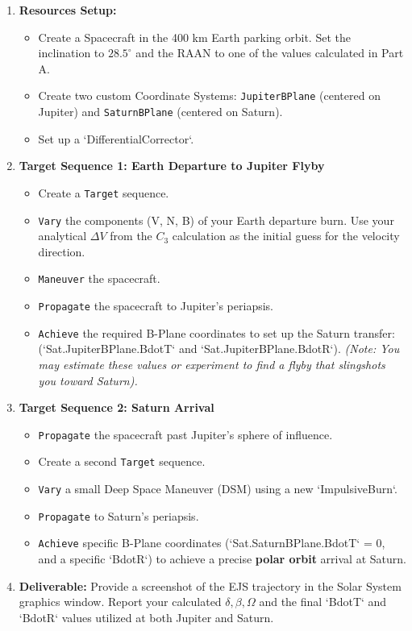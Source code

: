 \documentclass[11pt, letterpaper]{article}
\begin{document}
\begin{enumerate}
    \item \textbf{Resources Setup:} 
    \begin{itemize}
        \item Create a Spacecraft in the 400 km Earth parking orbit. Set the inclination to $28.5^\circ$ and the RAAN to one of the values calculated in Part A.
        \item Create two custom Coordinate Systems: \texttt{JupiterBPlane} (centered on Jupiter) and \texttt{SaturnBPlane} (centered on Saturn).
        \item Set up a `DifferentialCorrector`.
    \end{itemize}
    \item \textbf{Target Sequence 1: Earth Departure to Jupiter Flyby}
        \begin{itemize}
            \item Create a \texttt{Target} sequence.
            \item \texttt{Vary} the components (V, N, B) of your Earth departure burn. Use your analytical $\Delta V$ from the $C_3$ calculation as the initial guess for the velocity direction.
            \item \texttt{Maneuver} the spacecraft.
            \item \texttt{Propagate} the spacecraft to Jupiter's periapsis.
            \item \texttt{Achieve} the required B-Plane coordinates to set up the Saturn transfer: (`Sat.JupiterBPlane.BdotT` and `Sat.JupiterBPlane.BdotR`). \textit{(Note: You may estimate these values or experiment to find a flyby that slingshots you toward Saturn).}
        \end{itemize}
    \item \textbf{Target Sequence 2: Saturn Arrival}
        \begin{itemize}
            \item \texttt{Propagate} the spacecraft past Jupiter's sphere of influence.
            \item Create a second \texttt{Target} sequence.
            \item \texttt{Vary} a small Deep Space Maneuver (DSM) using a new `ImpulsiveBurn`.
            \item \texttt{Propagate} to Saturn's periapsis.
            \item \texttt{Achieve} specific B-Plane coordinates (`Sat.SaturnBPlane.BdotT` = 0, and a specific `BdotR`) to achieve a precise \textbf{polar orbit} arrival at Saturn.
        \end{itemize}
    \item \textbf{Deliverable:} Provide a screenshot of the EJS trajectory in the Solar System graphics window. Report your calculated $\delta, \beta, \Omega$ and the final `BdotT` and `BdotR` values utilized at both Jupiter and Saturn.
\end{enumerate}
\end{document}

